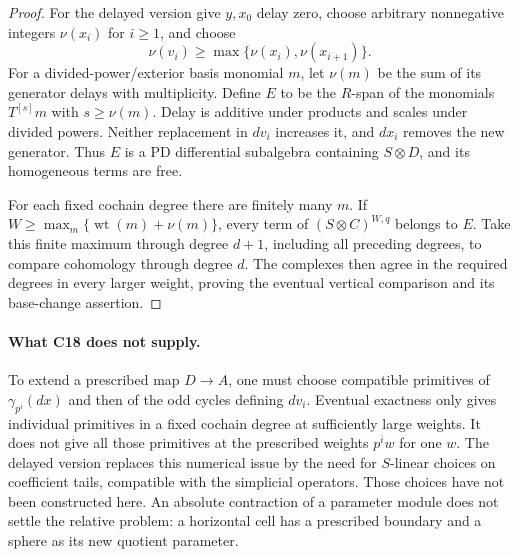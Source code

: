 \begin{proof}
For the delayed version give $y,x_0$ delay zero, choose arbitrary
nonnegative integers $\nu(x_i)$ for $i\geq1$, and choose
\[
 \nu(v_i)\geq\max\{\nu(x_i),\nu(x_{i+1})\}.
\]
For a divided-power/exterior basis monomial $m$, let $\nu(m)$ be
the sum of its generator delays with multiplicity. Define $E$ to
be the $R$-span of the monomials $T^{[s]}m$ with $s\geq\nu(m)$.
Delay is additive under products and scales under divided powers.
Neither replacement in $dv_i$ increases it, and $dx_i$ removes the
new generator. Thus $E$ is a PD differential subalgebra containing
$S\otimes D$, and its homogeneous terms are free.

For each fixed cochain degree there are finitely many $m$. If
$W\geq\max_m\{\operatorname{wt}(m)+\nu(m)\}$, every term of
$(S\otimes C)^{W,q}$ belongs to $E$. Take this finite maximum
through degree $d+1$, including all preceding degrees, to compare
cohomology through degree $d$. The complexes then agree in the
required degrees in every larger weight, proving the eventual
vertical comparison and its base-change assertion.
\end{proof}

\paragraph{What C18 does not supply.}
To extend a prescribed map $D\to A$, one must choose compatible
primitives of $\gamma_{p^i}(dx)$ and then of the odd cycles defining
$dv_i$. Eventual exactness only gives individual primitives in a
fixed cochain degree at sufficiently large weights. It does not
give all those primitives at the prescribed weights $p^iw$ for one
$w$. The delayed version replaces this numerical issue by the need
for $S$-linear choices on coefficient tails, compatible with the
simplicial operators. Those choices have not been constructed here.
An absolute contraction of a parameter module does not settle the
relative problem: a horizontal cell has a prescribed boundary and
a sphere as its new quotient parameter.

